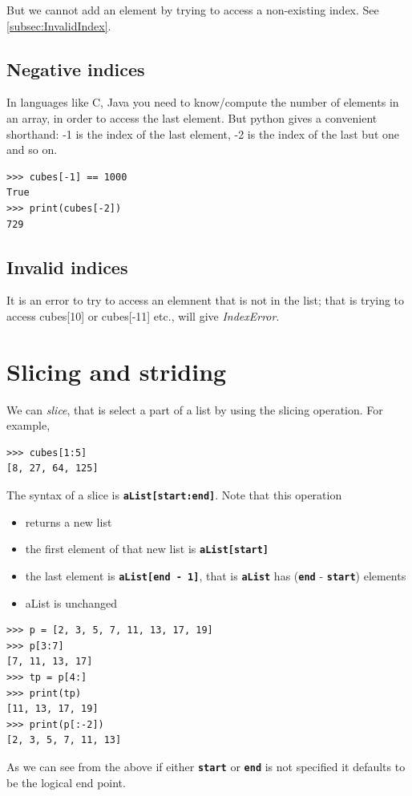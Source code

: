 \documentclass[11pt,a4paper]{article}
\newcommand{\Code}[1]{\textbf{\texttt{#1}}}
\begin{document}
But we cannot add an element by trying to access a non-existing index. See \ref{subsec:InvalidIndex}.

\subsection*{Negative indices}
In languages like C, Java you need to know/compute the number of elements in an array, in order to access the last element. But python gives a convenient shorthand: -1 is the index of the last element, -2 is the index of the last but one and so on.
\begin{verbatim}
>>> cubes[-1] == 1000
True
>>> print(cubes[-2])
729
\end{verbatim}
\subsection*{Invalid indices}
It is an error to try to access an elemnent that is not in the list; that is trying to access cubes[10] or cubes[-11] etc., will give \emph{IndexError}.
\label{subsec:InvalidIndex}

\section*{Slicing and striding}
We can \emph{slice}, that is select a part of a list by using the slicing operation. For example,
\begin{verbatim}
>>> cubes[1:5]
[8, 27, 64, 125]
\end{verbatim}

The syntax of a slice is \Code{aList[start:end]}. Note that this operation
    \begin{itemize}
        \item returns a new list
        \item the first element of that new list is \Code{aList[start]}
        \item the last element is \Code{aList[end - 1]}, that is \Code{aList} has (\Code{end} - \Code{start}) elements
        \item aList is unchanged
    \end{itemize}

\begin{verbatim}
>>> p = [2, 3, 5, 7, 11, 13, 17, 19]
>>> p[3:7]
[7, 11, 13, 17]
>>> tp = p[4:]
>>> print(tp)
[11, 13, 17, 19]
>>> print(p[:-2])
[2, 3, 5, 7, 11, 13]
\end{verbatim}

As we can see from the above if either \Code{start} or \Code{end} is not specified it defaults to be the logical end point.
\end{document}
